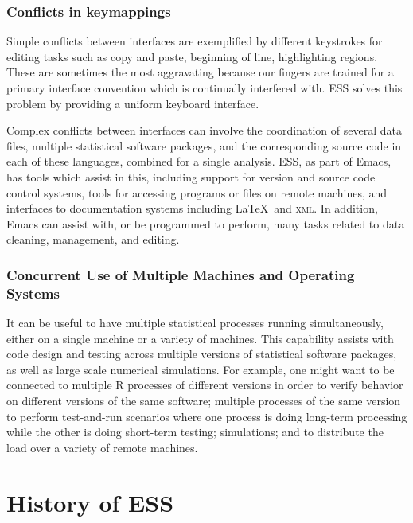 \documentclass{article}
\begin{document}
\subsubsection{Conflicts in keymappings}
\label{sec:confl-keym}

Simple conflicts between interfaces are exemplified by different
keystrokes for editing tasks such as copy and paste, beginning of
line, highlighting regions.  These are sometimes the most aggravating
because our fingers are trained for a primary interface convention
which is continually interfered with.  ESS solves this problem by
providing a uniform keyboard interface.

Complex conflicts between interfaces can involve the coordination of
several data files, multiple statistical software packages, and the
corresponding source code in each of these languages, combined for a
single analysis.  ESS, as part of Emacs, has tools which assist in
this, including support for version and source code control systems,
tools for accessing programs or files on remote machines, and
interfaces to documentation systems including \LaTeX\ and
\textsc{xml}.  In addition, Emacs can assist with, or be programmed to
perform, many tasks related to data cleaning, management, and editing.


\subsubsection{Concurrent Use of Multiple Machines and Operating
  Systems}
\label{sec:conc-use-mult}

It can be useful to have multiple statistical processes running
simultaneously, either on a single machine or a variety of machines.
This capability assists with code design and testing across multiple
versions of statistical software packages, as well as large scale
numerical simulations.  For example, one might want to be connected to
multiple R processes of different versions in order to verify behavior
on different versions of the same software; multiple processes of the
same version to perform test-and-run scenarios where one process is
doing long-term processing while the other is doing short-term
testing; simulations; and to distribute the load over a variety of
remote machines.

\section{History of ESS}
\label{sec:ESS:history}
\end{document}
